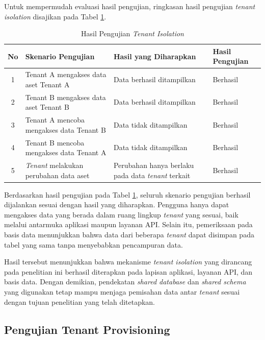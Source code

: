 Untuk mempermudah evaluasi hasil pengujian, ringkasan hasil pengujian \textit{tenant isolation} disajikan pada Tabel \ref{tab:hasil_pengujian_tenant_isolation}.

\begin{table}[H]
  \centering
  \caption{Hasil Pengujian \textit{Tenant Isolation}}
  \label{tab:hasil_pengujian_tenant_isolation}
  \footnotesize
  \begin{tabular}{|c|p{5cm}|p{4cm}|p{2.5cm}|}
    \hline
    \rowcolor[HTML]{EFEFEF}
    \textbf{No} & \textbf{Skenario Pengujian} & \textbf{Hasil yang Diharapkan} & \textbf{Hasil Pengujian} \\
    \hline
    1 & Tenant A mengakses data aset Tenant A & Data berhasil ditampilkan & Berhasil \\
    \hline
    2 & Tenant B mengakses data aset Tenant B & Data berhasil ditampilkan & Berhasil \\
    \hline
    3 & Tenant A mencoba mengakses data Tenant B & Data tidak ditampilkan & Berhasil \\
    \hline
    4 & Tenant B mencoba mengakses data Tenant A & Data tidak ditampilkan & Berhasil \\
    \hline
    5 & \textit{Tenant} melakukan perubahan data aset & Perubahan hanya berlaku pada data \textit{tenant} terkait & Berhasil \\
    \hline
  \end{tabular}
\end{table}

Berdasarkan hasil pengujian pada Tabel \ref{tab:hasil_pengujian_tenant_isolation}, seluruh skenario pengujian berhasil dijalankan sesuai dengan hasil yang diharapkan. Pengguna hanya dapat mengakses data yang berada dalam ruang lingkup \textit{tenant} yang sesuai, baik melalui antarmuka aplikasi maupun layanan API. Selain itu, pemeriksaan pada basis data menunjukkan bahwa data dari beberapa \textit{tenant} dapat disimpan pada tabel yang sama tanpa menyebabkan pencampuran data.

Hasil tersebut menunjukkan bahwa mekanisme \textit{tenant isolation} yang dirancang pada penelitian ini berhasil diterapkan pada lapisan aplikasi, layanan API, dan basis data. Dengan demikian, pendekatan \textit{shared database} dan \textit{shared schema} yang digunakan tetap mampu menjaga pemisahan data antar \textit{tenant} sesuai dengan tujuan penelitian yang telah ditetapkan.

\subsection{Pengujian Tenant Provisioning}


